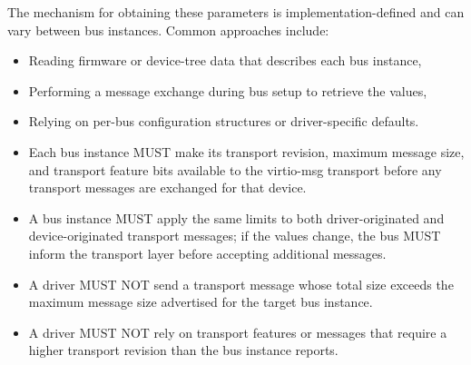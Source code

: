 The mechanism for obtaining these parameters is implementation-defined and can
vary between bus instances. Common approaches include:
\begin{itemize}
  \item Reading firmware or device-tree data that describes each bus instance,
  \item Performing a message exchange during bus setup to retrieve the values,
  \item Relying on per-bus configuration structures or driver-specific defaults.
\end{itemize}

\begin{itemize}
  \item Each bus instance MUST make its transport revision, maximum message
        size, and transport feature bits available to the virtio-msg transport
        before any transport messages are exchanged for that device.
  \item A bus instance MUST apply the same limits to both driver-originated and
        device-originated transport messages; if the values change, the bus
        MUST inform the transport layer before accepting additional messages.
\end{itemize}

\begin{itemize}
  \item A driver MUST NOT send a transport message whose total size exceeds the
        maximum message size advertised for the target bus instance.
  \item A driver MUST NOT rely on transport features or messages that require a
        higher transport revision than the bus instance reports.
\end{itemize}

